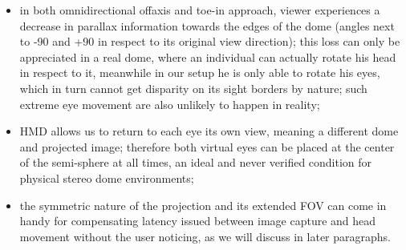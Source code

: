 \begin{itemize}
\item in both omnidirectional offaxis and toe-in approach, viewer experiences a decrease in parallax information towards the edges of the dome (angles next to -90 and +90 in respect to its original view direction); this loss can only be appreciated in a real dome, where an individual can actually rotate his head in respect to it, meanwhile in our setup he is only able to rotate his eyes, which in turn cannot get disparity on its sight borders by nature; such extreme eye movement are also unlikely to happen in reality;
\item HMD allows us to return to each eye its own view, meaning a different dome and projected image; therefore both virtual eyes can be placed at the center of the semi-sphere at all times, an ideal and never verified condition for physical stereo dome environments;
\item the symmetric nature of the projection and its extended FOV can come in handy for compensating latency issued between image capture and head movement without the user noticing, as we will discuss in later paragraphs.
\end{itemize}

\iffalse
PARALLEL with high fov
(+) no edge violation (close objects are welcome, high immersion)
(+) no keystoning
(+) no need to toe-in to compensate low fov..
(-) .. but still can be very distorted at edge (need high quality lens!)
(-) no stereo cues at the edge of the image
(-) hard to implement (due to additional undistortion)
(+) good vertical disparities (VSR)
\fi



